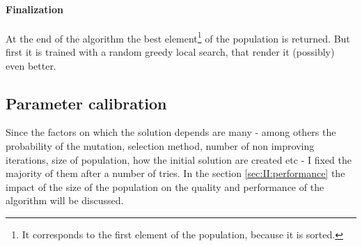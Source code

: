 
\paragraph{Finalization}
At the end of the algorithm the best element\footnote{It corresponds to the first element of the population, because it is sorted.} of the population is returned. But first it is trained with a random greedy local search, that render it (possibly) even better.



\subsection{Parameter calibration}
Since the factors on which the solution depends are many - among others the probability of the mutation, selection method, number of non improving iterations, size of population, how the initial solution are created etc - I fixed the majority of them after a number of tries.
In the section \ref{sec:II:performance} the impact of the size of the population on the quality and performance of the algorithm will be 
discussed.
